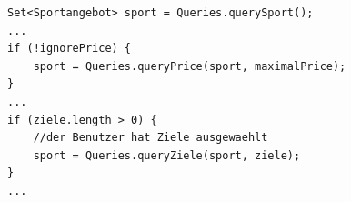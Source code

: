 \begin{lstlisting}[float=htbp, caption=Filtern von Sportarten, label=lst:filtern]
Set<Sportangebot> sport = Queries.querySport();
...        
if (!ignorePrice) {
	sport = Queries.queryPrice(sport, maximalPrice);
}
...
if (ziele.length > 0) {
	//der Benutzer hat Ziele ausgewaehlt
	sport = Queries.queryZiele(sport, ziele);
}
...                
\end{lstlisting}